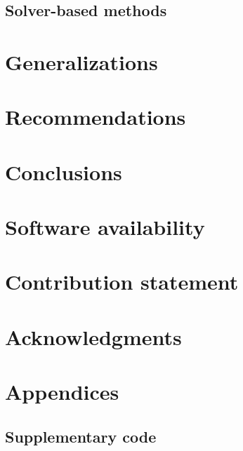 \documentclass[11pt]{article}
\begin{document}
\subsection{Solver-based methods}
\label{section:solver-methods}


\section{Generalizations}
\label{section:generalization}


\section{Recommendations}
\label{section:recomendations}


\section{Conclusions}


% 

\vspace{50px}
\section*{Software availability}

\section*{Contribution statement}

\section*{Acknowledgments}


\newpage
\appendix
\section*{Appendices}
\renewcommand{\thesubsection}{\Alph{subsection}}

% 
% 
\subsection{Supplementary code}

\label{appedix:code}



\newpage
\printbibliography[heading=bibintoc, title={References}]
\end{document}
